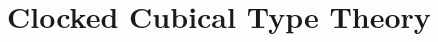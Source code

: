 \documentclass[a4paper,UKenglish,numberwithinsect,cleveref,thm-restate]{lipics-v2021}
\numberwithin{equation}{section}
\theoremstyle{plain}
\begin{document}


\appendix

\section{Clocked Cubical Type Theory}

%
%
%
\end{document}
